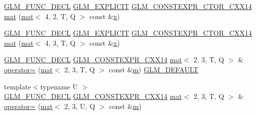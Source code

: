 \begin{DoxyCompactItemize}
\mbox{\hyperlink{setup_8hpp_ab2d052de21a70539923e9bcbf6e83a51}{G\+L\+M\+\_\+\+F\+U\+N\+C\+\_\+\+D\+E\+CL}} \mbox{\hyperlink{setup_8hpp_a6c74f5a5e7b134ab69023ff9a30d4d5d}{G\+L\+M\+\_\+\+E\+X\+P\+L\+I\+C\+IT}} \mbox{\hyperlink{setup_8hpp_a0900f9145e68bf6061b6f5e7be3fa751}{G\+L\+M\+\_\+\+C\+O\+N\+S\+T\+E\+X\+P\+R\+\_\+\+C\+T\+O\+R\+\_\+\+C\+X\+X14}} \mbox{\hyperlink{structglm_1_1mat_3_012_00_013_00_01_t_00_01_q_01_4_a592126e55a54fa4c50fee4e2b8be2fa9}{mat}} (\mbox{\hyperlink{structglm_1_1mat}{mat}}$<$ 4, 2, T, Q $>$ const \&\mbox{\hyperlink{_s_d_l__opengl_8h_ad0e63d0edcdbd3d79554076bf309fd47}{x}})
\item 
\mbox{\hyperlink{setup_8hpp_ab2d052de21a70539923e9bcbf6e83a51}{G\+L\+M\+\_\+\+F\+U\+N\+C\+\_\+\+D\+E\+CL}} \mbox{\hyperlink{setup_8hpp_a6c74f5a5e7b134ab69023ff9a30d4d5d}{G\+L\+M\+\_\+\+E\+X\+P\+L\+I\+C\+IT}} \mbox{\hyperlink{setup_8hpp_a0900f9145e68bf6061b6f5e7be3fa751}{G\+L\+M\+\_\+\+C\+O\+N\+S\+T\+E\+X\+P\+R\+\_\+\+C\+T\+O\+R\+\_\+\+C\+X\+X14}} \mbox{\hyperlink{structglm_1_1mat_3_012_00_013_00_01_t_00_01_q_01_4_a4c586529d0cf49309afb4ec2bbcb27f2}{mat}} (\mbox{\hyperlink{structglm_1_1mat}{mat}}$<$ 4, 3, T, Q $>$ const \&\mbox{\hyperlink{_s_d_l__opengl_8h_ad0e63d0edcdbd3d79554076bf309fd47}{x}})
\item 
\mbox{\hyperlink{setup_8hpp_ab2d052de21a70539923e9bcbf6e83a51}{G\+L\+M\+\_\+\+F\+U\+N\+C\+\_\+\+D\+E\+CL}} \mbox{\hyperlink{setup_8hpp_a4dd12abf5e1164bc57f3a34671d03844}{G\+L\+M\+\_\+\+C\+O\+N\+S\+T\+E\+X\+P\+R\+\_\+\+C\+X\+X14}} \mbox{\hyperlink{structglm_1_1mat}{mat}}$<$ 2, 3, T, Q $>$ \& \mbox{\hyperlink{structglm_1_1mat_3_012_00_013_00_01_t_00_01_q_01_4_aaea1ad3b980b3cdc31afe773e3902b80}{operator=}} (\mbox{\hyperlink{structglm_1_1mat}{mat}}$<$ 2, 3, T, Q $>$ const \&\mbox{\hyperlink{_s_d_l__opengl__glext_8h_af593500c283bf1a787a6f947f503a5c2}{m}}) \mbox{\hyperlink{setup_8hpp_aefce7051c376a64ba89fa93a9f63bc2c}{G\+L\+M\+\_\+\+D\+E\+F\+A\+U\+LT}}
\item 
{\footnotesize template$<$typename U $>$ }\\\mbox{\hyperlink{setup_8hpp_ab2d052de21a70539923e9bcbf6e83a51}{G\+L\+M\+\_\+\+F\+U\+N\+C\+\_\+\+D\+E\+CL}} \mbox{\hyperlink{setup_8hpp_a4dd12abf5e1164bc57f3a34671d03844}{G\+L\+M\+\_\+\+C\+O\+N\+S\+T\+E\+X\+P\+R\+\_\+\+C\+X\+X14}} \mbox{\hyperlink{structglm_1_1mat}{mat}}$<$ 2, 3, T, Q $>$ \& \mbox{\hyperlink{structglm_1_1mat_3_012_00_013_00_01_t_00_01_q_01_4_a6081b3f971290a780c85fff4786366b0}{operator=}} (\mbox{\hyperlink{structglm_1_1mat}{mat}}$<$ 2, 3, U, Q $>$ const \&\mbox{\hyperlink{_s_d_l__opengl__glext_8h_af593500c283bf1a787a6f947f503a5c2}{m}})

\end{DoxyCompactItemize}
